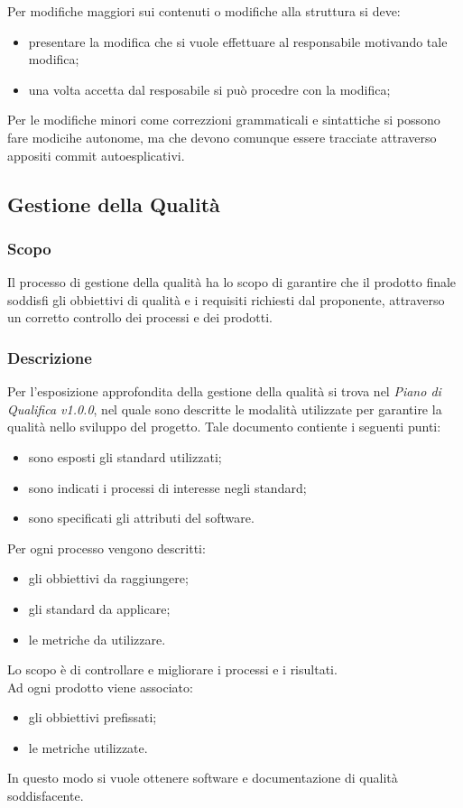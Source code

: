         Per modifiche maggiori sui contenuti o modifiche alla struttura si deve:
        \begin{itemize}
            \item presentare la modifica che si vuole effettuare al responsabile motivando tale modifica;
            \item una volta accetta dal resposabile si può procedre con la modifica; 
        \end{itemize} 
        Per le modifiche minori come correzzioni grammaticali e sintattiche si possono fare modicihe autonome, ma che devono comunque essere tracciate attraverso appositi commit autoesplicativi.
    \subsection{Gestione della Qualità}
        \subsubsection{Scopo}
        Il processo di gestione della qualità ha lo scopo di garantire che il prodotto finale soddisfi gli obbiettivi di qualità e i requisiti richiesti dal proponente, attraverso un corretto controllo dei processi e dei prodotti.
        \subsubsection{Descrizione}
        Per l'esposizione approfondita della gestione della qualità si trova nel \emph{Piano di Qualifica v1.0.0}, nel quale sono descritte le modalità utilizzate per garantire la qualità nello sviluppo del progetto. Tale documento contiente i seguenti punti:
        \begin{itemize}
            \item sono esposti gli standard utilizzati;
            \item sono indicati i processi di interesse negli standard;
            \item sono specificati gli attributi del software.
        \end{itemize}
        Per ogni processo vengono descritti:
        \begin{itemize}
            \item gli obbiettivi da raggiungere;
            \item gli standard da applicare;
            \item le metriche da utilizzare.
        \end{itemize}
        Lo scopo è di controllare e migliorare i processi e i risultati. \\
        Ad ogni prodotto viene associato:
        \begin{itemize}
            \item gli obbiettivi prefissati;
            \item le metriche utilizzate.
        \end{itemize} 
        In questo modo si vuole ottenere software e documentazione di qualità soddisfacente.
